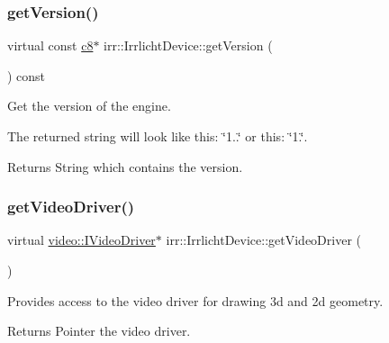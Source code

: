 \subsubsection{\texorpdfstring{get\+Version()}{getVersion()}\hspace{0.1cm}{\footnotesize\ttfamily [3/3]}}
{\footnotesize\ttfamily virtual const \hyperlink{namespaceirr_a9395eaea339bcb546b319e9c96bf7410}{c8}$\ast$ irr\+::\+Irrlicht\+Device\+::get\+Version (\begin{DoxyParamCaption}{ }\end{DoxyParamCaption}) const\hspace{0.3cm}{\ttfamily [pure virtual]}}



Get the version of the engine. 

The returned string will look like this\+: \char`\"{}1..\char`\"{} or this\+: \char`\"{}1.\char`\"{}. \begin{DoxyReturn}{Returns}
String which contains the version. 
\end{DoxyReturn}
\mbox{\label{classirr_1_1IrrlichtDevice_ada90707ba5c645d47e000e4e0f87c4c4}} 
\subsubsection{\texorpdfstring{get\+Video\+Driver()}{getVideoDriver()}\hspace{0.1cm}{\footnotesize\ttfamily [1/3]}}
{\footnotesize\ttfamily virtual \hyperlink{classirr_1_1video_1_1IVideoDriver}{video\+::\+I\+Video\+Driver}$\ast$ irr\+::\+Irrlicht\+Device\+::get\+Video\+Driver (\begin{DoxyParamCaption}{ }\end{DoxyParamCaption})\hspace{0.3cm}{\ttfamily [pure virtual]}}



Provides access to the video driver for drawing 3d and 2d geometry. 

\begin{DoxyReturn}{Returns}
Pointer the video driver. 
\end{DoxyReturn}
\mbox{\label{classirr_1_1IrrlichtDevice_ada90707ba5c645d47e000e4e0f87c4c4}} 
